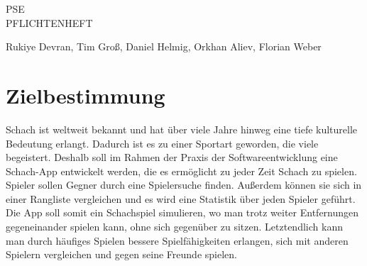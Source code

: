 \documentclass[parskip=full]{scrartcl}
\begin{document}
	\begin{titlepage}
		\centering
		\vspace*{0.2\textheight}
		{\Large PSE}\\[\baselineskip]
		{\Huge PFLICHTENHEFT}\\[\baselineskip]\par
		{\LARGE Rukiye Devran, Tim Groß, Daniel Helmig, Orkhan Aliev, Florian Weber}\par
	
	\newpage	
	\tableofcontents
	\pagebreak
	
	\end{titlepage}
\section{Zielbestimmung}

\gls{Schach} ist weltweit bekannt und hat über viele Jahre hinweg eine tiefe kulturelle Bedeutung erlangt. Dadurch ist es zu einer Sportart geworden, die viele begeistert.
Deshalb soll im Rahmen der Praxis der Softwareentwicklung eine \gls{Schach}-App entwickelt werden, die es ermöglicht zu jeder Zeit Schach zu spielen.
Spieler sollen Gegner durch eine Spielersuche finden. Außerdem können sie sich in einer Rangliste vergleichen und es wird eine Statistik über jeden Spieler geführt.
Die App soll somit ein \gls{Schach}spiel simulieren, wo man trotz weiter Entfernungen gegeneinander spielen kann, ohne sich gegenüber zu sitzen.
Letztendlich kann man durch häufiges Spielen bessere Spielfähigkeiten erlangen, sich mit anderen Spielern vergleichen und gegen seine Freunde spielen.
\end{document}
